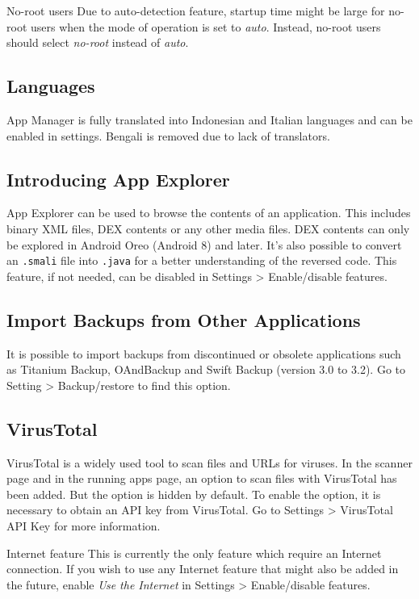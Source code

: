 \begin{tip}{No-root users}
    Due to auto-detection feature, startup time might be large for no-root users when the mode of operation is set to \textit{auto}.
    Instead, no-root users should select \textit{no-root} instead of \textit{auto}.
\end{tip}

\subsection{Languages}
App Manager is fully translated into Indonesian and Italian languages and can be enabled in settings. Bengali is removed due to lack of translators.

\subsection{Introducing App Explorer}
App Explorer can be used to browse the contents of an application. This includes binary XML files, DEX contents or any other media files.
DEX contents can only be explored in Android Oreo (Android 8) and later. It's also possible to convert an \texttt{.smali} file into \texttt{.java} for a better understanding of the reversed code.
This feature, if not needed, can be disabled in Settings > Enable/disable features.

\subsection{Import Backups from Other Applications}
It is possible to import backups from discontinued or obsolete applications such as Titanium Backup, OAndBackup and Swift Backup (version 3.0 to 3.2).
Go to Setting > Backup/restore to find this option.

\subsection{VirusTotal}
VirusTotal is a widely used tool to scan files and URLs for viruses. In the scanner page and in the running apps page, an option to scan files with VirusTotal has been added.
But the option is hidden by default. To enable the option, it is necessary to obtain an API key from VirusTotal. Go to Settings > VirusTotal API Key for more information.

\begin{warning}{Internet feature}
    This is currently the only feature which require an Internet connection. If you wish to use any Internet feature that might also be added in the future,
    enable \textit{Use the Internet} in Settings > Enable/disable features.
\end{warning}

